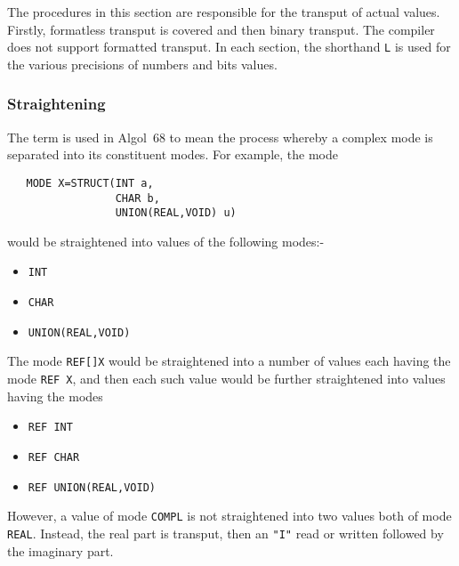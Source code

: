 The procedures in this section are responsible for the trans\-put of
actual values. Firstly, formatless transput is covered and then binary
transput. The  compiler does not support formatted
transput. In each section, the shorthand \verb|L| is used for the
various precisions of numbers and bits values.

\subsubsection*{Straightening}
The term  is used in Algol~68 to mean the process
whereby a complex mode is separated into its constituent modes. For
example, the mode
\begin{verbatim}
   MODE X=STRUCT(INT a,
                 CHAR b,
                 UNION(REAL,VOID) u)
\end{verbatim}
\noindent
would be straightened into values of the following modes:-
\begin{itemize}
\item \verb|INT|
\item \verb|CHAR|
\item \verb|UNION(REAL,VOID)|
\end{itemize}
The mode \verb|REF[]X| would be straightened into a number of values
each having the mode \verb|REF X|, and then each such value would be
further straightened into values having the modes
\begin{itemize}
\item \verb|REF INT|
\item \verb|REF CHAR|
\item \verb|REF UNION(REAL,VOID)|
\end{itemize}
However, a value of mode \verb|COMPL| is not straightened into two
values both of mode \verb|REAL|. Instead, the real part is transput,
then an \verb|"I"| read or written followed by the imaginary part.

